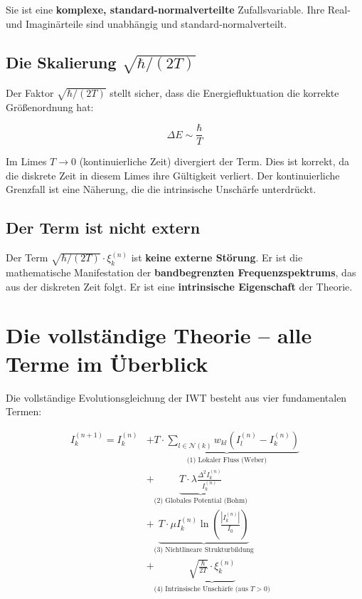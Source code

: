 Sie ist eine \textbf{komplexe, standard-normalverteilte} Zufallsvariable. Ihre Real- und Imaginärteile sind unabhängig und standard-normalverteilt.

\subsection{Die Skalierung \( \sqrt{\hbar/(2T)} \)}

Der Faktor \( \sqrt{\hbar/(2T)} \) stellt sicher, dass die Energiefluktuation die korrekte Größenordnung hat:

\[
\Delta E \sim \frac{\hbar}{T}
\]

Im Limes \( T \to 0 \) (kontinuierliche Zeit) divergiert der Term. Dies ist korrekt, da die diskrete Zeit in diesem Limes ihre Gültigkeit verliert. Der kontinuierliche Grenzfall ist eine Näherung, die die intrinsische Unschärfe unterdrückt.

\subsection{Der Term ist nicht extern}

Der Term \( \sqrt{\hbar/(2T)} \cdot \xi_k^{(n)} \) ist \textbf{keine externe Störung}. Er ist die mathematische Manifestation der \textbf{bandbegrenzten Frequenzspektrums}, das aus der diskreten Zeit folgt. Er ist eine \textbf{intrinsische Eigenschaft} der Theorie.

\section{Die vollständige Theorie – alle Terme im Überblick}
\label{app:iwt_eq_ueberblick}

Die vollständige Evolutionsgleichung der IWT besteht aus vier fundamentalen Termen:

\[
\boxed{
\begin{aligned}
I_k^{(n+1)} = I_k^{(n)} &+ \underbrace{T \cdot \sum_{l \in \mathcal{N}(k)} w_{kl} (I_l^{(n)} - I_k^{(n)})}_{\text{(1) Lokaler Fluss (Weber)}} \\
&+ \underbrace{T \cdot \lambda \frac{\Delta^2 I_k^{(n)}}{I_k^{(n)}}}_{\text{(2) Globales Potential (Bohm)}} \\
&+ \underbrace{T \cdot \mu I_k^{(n)} \ln\left(\frac{|I_k^{(n)}|}{I_0}\right)}_{\text{(3) Nichtlineare Strukturbildung}} \\
&+ \underbrace{\sqrt{\frac{\hbar}{2T}} \cdot \xi_k^{(n)}}_{\text{(4) Intrinsische Unschärfe (aus } T > 0 \text{)}}
\end{aligned}
}
\tag{P.3}
\]

